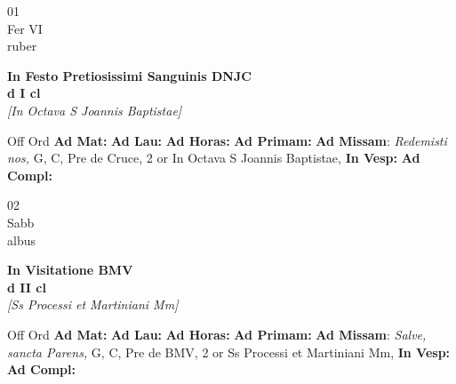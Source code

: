 \documentclass[10pt, openany]{book}
\begin{document}
        \begin{center}
            \begin{minipage}{3.5in}
                \vspace{2em}
                \begin{minipage}{0.5in}
                    {\Huge 01} \\
                    {\normalsize Fer VI} \\
                    {\normalsize ruber}
                \end{minipage}
                \begin{minipage}{3.0in}
                    \textbf{ \large In Festo Pretiosissimi Sanguinis DNJC \\
                    \textnormal{\normalsize d I cl}} \\ \textit{[In Octava S Joannis Baptistae]} \\ 
                \end{minipage}
                \begin{justify}Off Ord
                    \textbf{Ad Mat: }
                    \textbf{Ad Lau: }
                    \textbf{Ad Horas: }
                    \textbf{Ad Primam: }\textbf{Ad Missam}: \textit{Redemisti nos,} G, C, Pre de Cruce, 2 or In Octava S Joannis Baptistae,  
                    \textbf{In Vesp: }
                    \textbf{Ad Compl: }
                \end{justify}
            \end{minipage}
        \end{center}
    
        \begin{center}
            \begin{minipage}{3.5in}
                \vspace{2em}
                \begin{minipage}{0.5in}
                    {\Huge 02} \\
                    {\normalsize Sabb} \\
                    {\normalsize albus}
                \end{minipage}
                \begin{minipage}{3.0in}
                    \textbf{ \large In Visitatione BMV \\
                    \textnormal{\normalsize d II cl}} \\ \textit{[Ss Processi et Martiniani Mm]} \\ 
                \end{minipage}
                \begin{justify}Off Ord
                    \textbf{Ad Mat: }
                    \textbf{Ad Lau: }
                    \textbf{Ad Horas: }
                    \textbf{Ad Primam: }\textbf{Ad Missam}: \textit{Salve, sancta Parens,} G, C, Pre de BMV, 2 or Ss Processi et Martiniani Mm,  
                    \textbf{In Vesp: }
                    \textbf{Ad Compl: }
                \end{justify}
            \end{minipage}
        \end{center}
    
\end{document}
